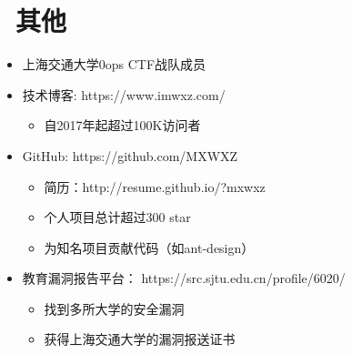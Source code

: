 \documentclass{resume}
\begin{document}
\section{\faInfo\ 其他}
\begin{itemize}[parsep=0.5ex]
    \item 上海交通大学0ops CTF战队成员
    \item 技术博客: https://www.imwxz.com/
          \begin{itemize}
              \item 自2017年起超过100K访问者
          \end{itemize}
    \item GitHub: https://github.com/MXWXZ
          \begin{itemize}
              \item 简历：http://resume.github.io/?mxwxz
              \item 个人项目总计超过300 star
              \item 为知名项目贡献代码（如ant-design）
          \end{itemize}
    \item 教育漏洞报告平台： https://src.sjtu.edu.cn/profile/6020/
          \begin{itemize}
              \item 找到多所大学的安全漏洞
              \item 获得上海交通大学的漏洞报送证书
          \end{itemize}
\end{itemize}

%
%
\end{document}
